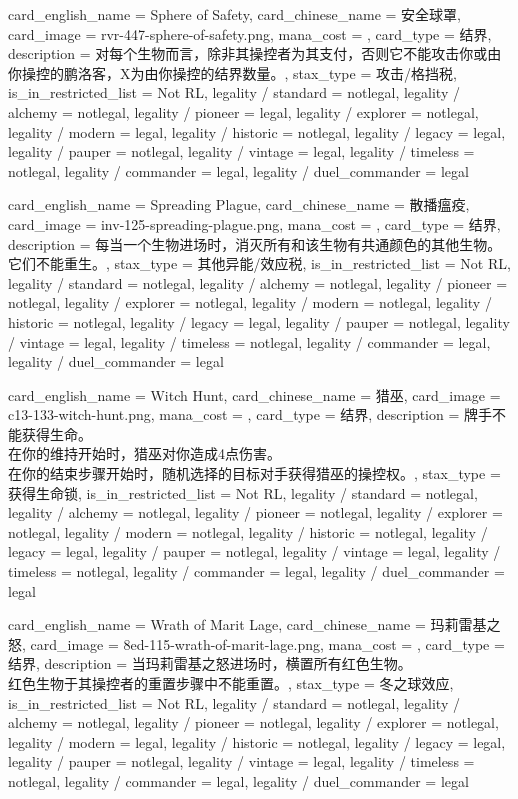 \documentclass[lang = cn, color = black, 10pt]{AllThatStax}
\begin{document}
\card
{
	card_english_name = {Sphere of Safety},
	card_chinese_name = {安全球罩},
	card_image = rvr-447-sphere-of-safety.png,
	mana_cost = ,
	card_type = 结界,
	description = {对每个生物而言，除非其操控者为其支付，否则它不能攻击你或由你操控的鹏洛客，X为由你操控的结界数量。},
	stax_type = 攻击/格挡税,
	is_in_restricted_list = Not RL,
	legality / standard = notlegal,
	legality / alchemy = notlegal,
	legality / pioneer = legal,
	legality / explorer = notlegal,
	legality / modern = legal,
	legality / historic = notlegal,
	legality / legacy = legal,
	legality / pauper = notlegal,
	legality / vintage = legal,
	legality / timeless = notlegal,
	legality / commander = legal,
	legality / duel_commander = legal
}

\card
{
	card_english_name = {Spreading Plague},
	card_chinese_name = {散播瘟疫},
	card_image = inv-125-spreading-plague.png,
	mana_cost = ,
	card_type = 结界,
	description = {每当一个生物进场时，消灭所有和该生物有共通颜色的其他生物。它们不能重生。},
	stax_type = 其他异能/效应税,
	is_in_restricted_list = Not RL,
	legality / standard = notlegal,
	legality / alchemy = notlegal,
	legality / pioneer = notlegal,
	legality / explorer = notlegal,
	legality / modern = notlegal,
	legality / historic = notlegal,
	legality / legacy = legal,
	legality / pauper = notlegal,
	legality / vintage = legal,
	legality / timeless = notlegal,
	legality / commander = legal,
	legality / duel_commander = legal
}

\card
{
	card_english_name = {Witch Hunt},
	card_chinese_name = {猎巫},
	card_image = c13-133-witch-hunt.png,
	mana_cost = ,
	card_type = 结界,
	description = {牌手不能获得生命。\\
在你的维持开始时，猎巫对你造成4点伤害。\\
在你的结束步骤开始时，随机选择的目标对手获得猎巫的操控权。},
	stax_type = 获得生命锁,
	is_in_restricted_list = Not RL,
	legality / standard = notlegal,
	legality / alchemy = notlegal,
	legality / pioneer = notlegal,
	legality / explorer = notlegal,
	legality / modern = notlegal,
	legality / historic = notlegal,
	legality / legacy = legal,
	legality / pauper = notlegal,
	legality / vintage = legal,
	legality / timeless = notlegal,
	legality / commander = legal,
	legality / duel_commander = legal
}

\card
{
	card_english_name = {Wrath of Marit Lage},
	card_chinese_name = {玛莉雷基之怒},
	card_image = 8ed-115-wrath-of-marit-lage.png,
	mana_cost = ,
	card_type = 结界,
	description = {当玛莉雷基之怒进场时，横置所有红色生物。\\
红色生物于其操控者的重置步骤中不能重置。},
	stax_type = 冬之球效应,
	is_in_restricted_list = Not RL,
	legality / standard = notlegal,
	legality / alchemy = notlegal,
	legality / pioneer = notlegal,
	legality / explorer = notlegal,
	legality / modern = legal,
	legality / historic = notlegal,
	legality / legacy = legal,
	legality / pauper = notlegal,
	legality / vintage = legal,
	legality / timeless = notlegal,
	legality / commander = legal,
	legality / duel_commander = legal
}
\end{document}
